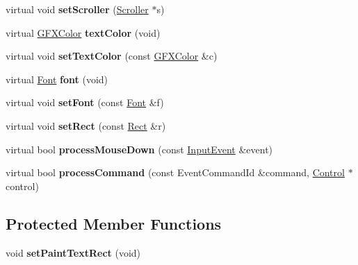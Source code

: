 \begin{DoxyCompactItemize}
\item 
virtual void {\bfseries set\+Scroller} (\hyperlink{classScroller}{Scroller} $\ast$s)\hypertarget{classStaticDisplay_afd8591b0c5f91015948a417ce16c9c13}{}\label{classStaticDisplay_afd8591b0c5f91015948a417ce16c9c13}

\item 
virtual \hyperlink{structGFXColor}{G\+F\+X\+Color} {\bfseries text\+Color} (void)\hypertarget{classStaticDisplay_a29186f23f888ff2063f6237ca74dcd96}{}\label{classStaticDisplay_a29186f23f888ff2063f6237ca74dcd96}

\item 
virtual void {\bfseries set\+Text\+Color} (const \hyperlink{structGFXColor}{G\+F\+X\+Color} \&c)\hypertarget{classStaticDisplay_ad1dbb2c9ca6f2ed0daffcf7c2cee1e20}{}\label{classStaticDisplay_ad1dbb2c9ca6f2ed0daffcf7c2cee1e20}

\item 
virtual \hyperlink{classFont}{Font} {\bfseries font} (void)\hypertarget{classStaticDisplay_a1b6c7c7667b97bd99259e7b017e909ad}{}\label{classStaticDisplay_a1b6c7c7667b97bd99259e7b017e909ad}

\item 
virtual void {\bfseries set\+Font} (const \hyperlink{classFont}{Font} \&f)\hypertarget{classStaticDisplay_ad318ae195624a6f75557d0e6b72c586a}{}\label{classStaticDisplay_ad318ae195624a6f75557d0e6b72c586a}

\item 
virtual void {\bfseries set\+Rect} (const \hyperlink{classRect}{Rect} \&r)\hypertarget{classStaticDisplay_a30b53ea654944a734443dae81a46f406}{}\label{classStaticDisplay_a30b53ea654944a734443dae81a46f406}

\item 
virtual bool {\bfseries process\+Mouse\+Down} (const \hyperlink{structInputEvent}{Input\+Event} \&event)\hypertarget{classStaticDisplay_a21599647abeca5c4ae44ab279321d290}{}\label{classStaticDisplay_a21599647abeca5c4ae44ab279321d290}

\item 
virtual bool {\bfseries process\+Command} (const Event\+Command\+Id \&command, \hyperlink{classControl}{Control} $\ast$control)\hypertarget{classStaticDisplay_a8fb2ed196a5e51d3716a901938b4d8da}{}\label{classStaticDisplay_a8fb2ed196a5e51d3716a901938b4d8da}

\end{DoxyCompactItemize}
\subsection*{Protected Member Functions}
\begin{DoxyCompactItemize}
\item 
void {\bfseries set\+Paint\+Text\+Rect} (void)\hypertarget{classStaticDisplay_a674f60963f0db4b960adadb364aadd70}{}\label{classStaticDisplay_a674f60963f0db4b960adadb364aadd70}

\end{DoxyCompactItemize}
